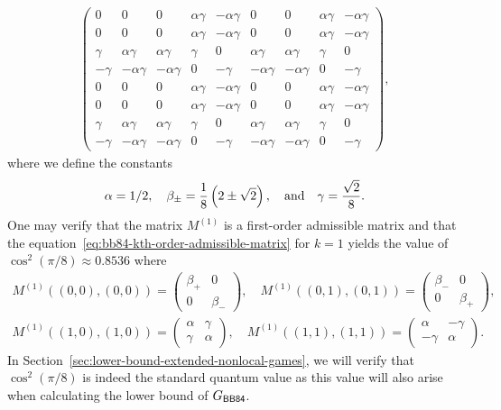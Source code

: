 \begin{equation}
\begin{aligned}
\begin{pmatrix}
					0 & 0 & 0 & \alpha \gamma & -\alpha \gamma & 0 & 0 & \alpha \gamma & -\alpha \gamma \\
					0 & 0 & 0 & \alpha \gamma & -\alpha \gamma & 0 & 0 & \alpha \gamma & -\alpha \gamma \\
						\gamma & \alpha \gamma & \alpha \gamma & \gamma & 0 & \alpha \gamma & \alpha \gamma & \gamma & 0 \\
				-\gamma & -\alpha \gamma & -\alpha \gamma & 0 & -\gamma & -\alpha \gamma & -\alpha \gamma & 0 & -\gamma \\
					0 & 0 & 0 & \alpha \gamma & -\alpha \gamma & 0 & 0 & \alpha \gamma & -\alpha \gamma \\ 
				0 & 0 & 0 & \alpha \gamma & -\alpha \gamma & 0 & 0 & \alpha \gamma & -\alpha \gamma \\
				\gamma & \alpha \gamma & \alpha \gamma & \gamma & 0 & \alpha \gamma & \alpha \gamma & \gamma & 0 \\
				-\gamma & -\alpha \gamma & -\alpha \gamma & 0 & -\gamma & -\alpha \gamma & -\alpha \gamma & 0 & -\gamma 															 \end{pmatrix},
	\end{aligned}
\end{equation}
where we define the constants 
\begin{align}
	\alpha = 1/2, \quad \beta_{\pm} = \frac{1}{8} \left( 2 \pm \sqrt{2} \right), \quad \textnormal{and} \quad \gamma = \frac{\sqrt{2}}{8}.
\end{align}
One may verify that the matrix $M^{(1)}$ is a first-order admissible matrix and that the equation~\eqref{eq:bb84-kth-order-admissible-matrix} for $k = 1$ yields the value of $\cos^2(\pi/8) \approx 0.8536$ where 
\begin{equation}
	\begin{aligned}
		M^{(1)}((0,0),(0,0)) = \begin{pmatrix} \beta_+ & 0 \\ 0 & \beta_- \end{pmatrix}, \quad M^{(1)}((0,1),(0,1)) = \begin{pmatrix} \beta_- & 0 \\ 0 & \beta_+ \end{pmatrix}, \\
		M^{(1)}((1,0),(1,0)) = \begin{pmatrix} \alpha & \gamma \\ \gamma & \alpha \end{pmatrix}, \quad M^{(1)}((1,1),(1,1)) = \begin{pmatrix} \alpha & -\gamma \\ -\gamma & \alpha \end{pmatrix}.
	\end{aligned}
\end{equation}
In Section~\ref{sec:lower-bound-extended-nonlocal-games}, we will verify that $\cos^2(\pi/8)$ is indeed the standard quantum value as this value will also arise when calculating the lower bound of $G_{\BB84}$.  

